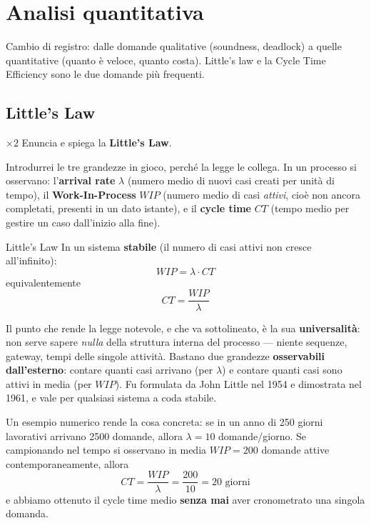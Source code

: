 \chapter{Analisi quantitativa}

Cambio di registro: dalle domande qualitative (soundness, deadlock) a quelle quantitative (quanto è veloce, quanto costa). Little's law e la Cycle Time Efficiency sono le due domande più frequenti.

\section{Little's Law}

\begin{domanda}{$\times 2$}
Enuncia e spiega la \textbf{Little's Law}.
\end{domanda}

Introdurrei le tre grandezze in gioco, perché la legge le collega. In un processo si osservano: l'\textbf{arrival rate} $\lambda$ (numero medio di nuovi casi creati per unità di tempo), il \textbf{Work-In-Process} $WIP$ (numero medio di casi \emph{attivi}, cioè non ancora completati, presenti in un dato istante), e il \textbf{cycle time} $CT$ (tempo medio per gestire un caso dall'inizio alla fine).

\begin{teorema}{Little's Law}
In un sistema \textbf{stabile} (il numero di casi attivi non cresce all'infinito):
$$WIP = \lambda \cdot CT$$
equivalentemente
$$CT = \frac{WIP}{\lambda}$$
\end{teorema}

Il punto che rende la legge notevole, e che va sottolineato, è la sua \textbf{universalità}: non serve sapere \emph{nulla} della struttura interna del processo — niente sequenze, gateway, tempi delle singole attività. Bastano due grandezze \textbf{osservabili dall'esterno}: contare quanti casi arrivano (per $\lambda$) e contare quanti casi sono attivi in media (per $WIP$). Fu formulata da John Little nel 1954 e dimostrata nel 1961, e vale per qualsiasi sistema a coda stabile.

Un esempio numerico rende la cosa concreta: se in un anno di 250 giorni lavorativi arrivano 2500 domande, allora $\lambda = 10$ domande/giorno. Se campionando nel tempo si osservano in media $WIP = 200$ domande attive contemporaneamente, allora
$$CT = \frac{WIP}{\lambda} = \frac{200}{10} = 20 \text{ giorni}$$
e abbiamo ottenuto il cycle time medio \textbf{senza mai} aver cronometrato una singola domanda.

